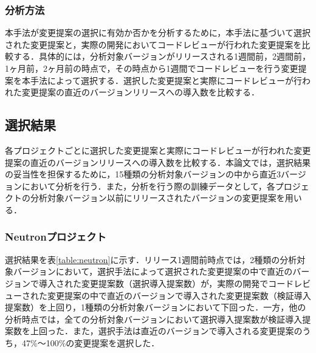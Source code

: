 \documentclass[submit,ses,noauthor]{ipsj}
\begin{document}
\subsubsection{分析方法}
本手法が変更提案の選択に有効か否かを分析するために，本手法に基づいて選択された変更提案と，実際の開発においてコードレビューが行われた変更提案を比較する．具体的には，分析対象バージョンがリリースされる1週間前，2週間前，1ヶ月前，2ヶ月前の時点で，その時点から1週間でコードレビューを行う変更提案を本手法によって選択する．選択した変更提案と実際にコードレビューが行われた変更提案の直近のバージョンリリースへの導入数を比較する．

\subsection{選択結果}
各プロジェクトごとに選択した変更提案と実際にコードレビューが行われた変更提案の直近のバージョンリリースへの導入数を比較する．本論文では，選択結果の妥当性を担保するために，15種類の分析対象バージョンの中から直近3バージョンにおいて分析を行う．また，分析を行う際の訓練データとして，各プロジェクトの分析対象バージョン以前にリリースされたバージョンの変更提案を用いる．

\subsubsection{Neutronプロジェクト}\label{chap:neutron}
選択結果を表\ref{table:neutron}に示す．リリース1週間前時点では，2種類の分析対象バージョンにおいて，選択手法によって選択された変更提案の中で直近のバージョンで導入された変更提案数（選択導入提案数）が，実際の開発でコードレビューされた変更提案の中で直近のバージョンで導入された変更提案数（検証導入提案数）を上回り，1種類の分析対象バージョンにおいて下回った．一方，他の分析時点では，全ての分析対象バージョンにおいて選択導入提案数が検証導入提案数を上回った．また，選択手法は直近のバージョンで導入される変更提案のうち，47\%〜100\%の変更提案を選択した．
\end{document}
